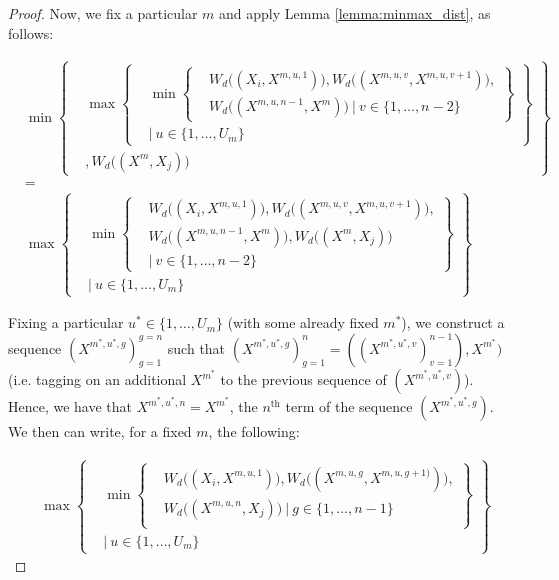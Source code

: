 \documentclass{article} %
\theoremstyle{style1}
\theoremstyle{style1}
\theoremstyle{example}
\begin{document}
\begin{proof}
Now, we fix a particular $m$ and apply Lemma \ref{lemma:minmax_dist}, as follows:

\[
\begin{aligned}
&\min
      \left\{
      \begin{aligned}
        &\max
          \left\{
          \begin{aligned}
            &\min\left\{
            \begin{aligned}
            &W_d\big((X_i,X^{m,u,1})\big), W_d\big((X^{m,u,v},X^{m,u,v+1})\big), \\
            &W_d\big((X^{m,u,n-1},X^m)\big)\ |\ v\in\{1,\ldots,n-2\}
            \end{aligned}
            \right\} \\
            &|\ u\in\{1,\ldots,U_m\}
          \end{aligned}
          \right\} \\
          &, W_d\big((X^m,X_j)\big)
      \end{aligned}
      \right\} \\
      &= \\
&\max
          \left\{
          \begin{aligned}
            &\min\left\{
            \begin{aligned}
            &W_d\big((X_i,X^{m,u,1})\big), W_d\big((X^{m,u,v},X^{m,u,v+1})\big), \\
            &W_d\big((X^{m,u,n-1},X^m)\big), W_d\big((X^m,X_j)\big)\ \\
            &|\ v\in\{1,\ldots,n-2\}
            \end{aligned}
            \right\} \\
            &|\ u\in\{1,\ldots,U_m\}
          \end{aligned}
          \right\}
\end{aligned}
\]

Fixing a particular $u^*\in\{1,\ldots,U_m\}$ (with some already fixed $m^*$), we construct a sequence $(X^{m^*,u^*,g})_{g=1}^{g=n}$ such that $(X^{m^*,u^*,g})_{g=1}^n=((X^{m^*,u^*,v})_{v=1}^{n-1}),X^{m^*})$ (i.e. tagging on an additional $X^{m^*}$ to the previous sequence of $(X^{m^*,u^*,v})$). Hence, we have that $X^{m^*,u^*,n}=X^{m^*}$, the $n^{\textrm{th}}$ term of the sequence $(X^{m^*,u^*,g})$. We then can write, for a fixed $m$, the following:

\[
\begin{aligned}
&\max
          \left\{
          \begin{aligned}
            &\min\left\{
            \begin{aligned}
            &W_d\big((X_i,X^{m,u,1})\big), W_d\big((X^{m,u,g},X^{m,u,g+1)})\big), \\
            &W_d\big((X^{m,u,n},X_j)\big)\ |\ g\in\{1,\ldots,n-1\}\\
            \end{aligned}
            \right\} \\
            &|\ u\in\{1,\ldots,U_m\}
          \end{aligned}
          \right\}
\end{aligned}
\]




\end{proof}
\end{document}
